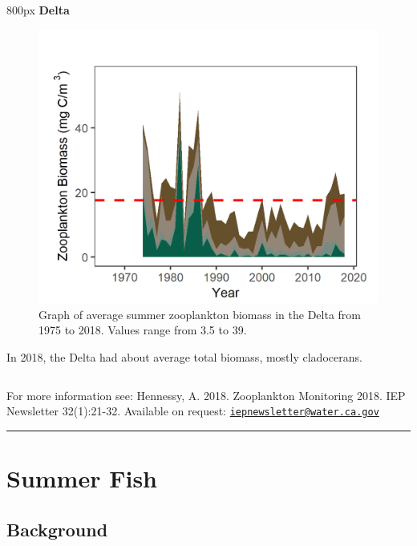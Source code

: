 \documentclass[
]{book}
\begin{document}
\begin{column}{800px\textwidth}
\textbf{Delta}

\begin{figure}
\includegraphics[width=15.25in]{figures/zoops_dtsummer} \caption{Graph of average summer zooplankton biomass in the Delta from 1975 to 2018. Values range from 3.5 to 39.}\label{fig:unnamed-chunk-72}
\end{figure}

In 2018, the Delta had about average total biomass, mostly cladocerans.
\end{column}

\begin{disclaimer}
For more information see: Hennessy, A. 2018. Zooplankton Monitoring
2018. IEP Newsletter 32(1):21-32. Available on request:
\href{mailto:iepnewsletter@water.ca.gov}{\nolinkurl{iepnewsletter@water.ca.gov}}
\end{disclaimer}

\begin{center}\rule{0.5\linewidth}{0.5pt}\end{center}

\hypertarget{summer-fish}{%
\section{Summer Fish}\label{summer-fish}}

\hypertarget{background-10}{%
\subsection{Background}\label{background-10}}
\end{document}
